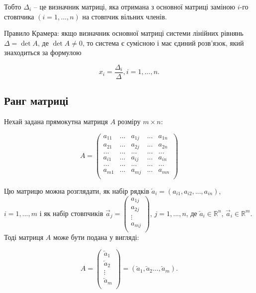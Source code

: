 Тобто $\Delta_i$ -- це визначник матриці, яка отримана з основної матриці заміною $i$-го
стовпчика $(i = 1, ..., n)$ на стовпчик вільних членів.

Правило Крамера: якщо визначник основної матриці системи лінійних рівнянь
$\Delta = \det A$, де $\det A \neq 0$, то система є сумісною і має єдиний розв’язок, який знаходиться за
формулою

$$x_i = \dfrac{\Delta_i}{\Delta}, i = 1, ..., n.$$

\subsection{Ранг матриці}  %

Нехай задана прямокутна матриця $A$ розміру $m \times n$:

$$ A = \begin{pmatrix}
	a_{11} & ... & a_{1j} & ... & a_{1n} \\
	a_{21} & ... & a_{2j} & ... & a_{2n} \\
	...    & ... & ...    & ... & ...    \\
	a_{i1} & ... & a_{ij} & ... & a_{in} \\
	...    & ... & ...    & ... & ...    \\
	a_{m1} & ... & a_{mj} & ... & a_{mn} \\
\end{pmatrix} $$


Цю матрицю можна розглядати, як набір рядків $\overleftarrow{a}_i = (a_{i1}, a_{i2}, ..., a_{in})$, $i = 1, ..., m$ і
як набір стовпчиків $\overrightarrow{a}_j = \begin{pmatrix}
	a_{1j} \\
	a_{2j} \\
	\vdots \\
	a_{mj} \\
\end{pmatrix} $, $j = 1, ..., n$, де $\overleftarrow{a}_i \in \mathbb{R}^n$, 
$\overrightarrow{a}_i \in \mathbb{R}^m$. Тоді матриця $A$
може бути подана у вигляді:

$$A = \begin{pmatrix}
	\overleftarrow{a}_1 \\
	\overleftarrow{a}_2 \\
	\vdots \\
	\overleftarrow{a}_m \\
\end{pmatrix}  = (\overleftarrow{a}_1, \overleftarrow{a}_2 ..., \overleftarrow{a}_m).$$


